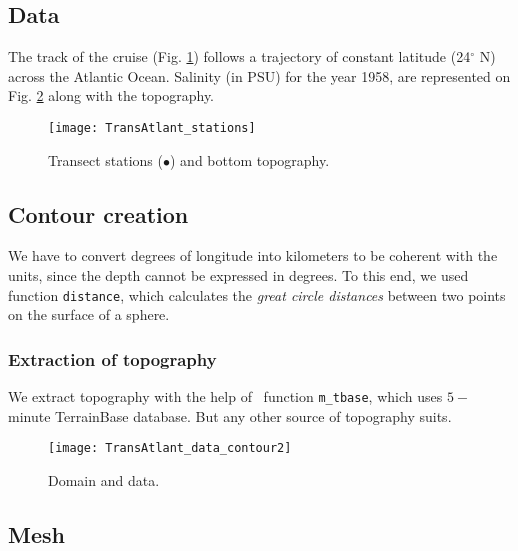 \subsection{Data}

The track of the cruise (Fig. \ref{fig:transectprofiles}) follows a trajectory of constant latitude (24$^{\circ}$ N) across the Atlantic Ocean. Salinity (in PSU) for the year 1958, are represented on Fig. \ref{fig:domaindata} along with the topography. 

\begin{figure}[htpb]
\centering
\texttt{[image: TransAtlant\_stations]}
\caption{Transect stations ($\bullet$) and bottom topography.\label{fig:transectprofiles}}
\end{figure}

\subsection{Contour creation}

We have to convert degrees of longitude into kilometers to be coherent with the units, since the depth cannot be expressed in degrees. To this end, we used \matlab\,function \texttt{distance}, which calculates the \textit{great circle distances} between two points on the surface of a sphere.  

\subsubsection{Extraction of topography}

We extract topography with the help of \matlab\, function  \texttt{m\_tbase}, which uses $5-$minute TerrainBase database. But any other source of topography suits.
				
\begin{figure}[H]
\centering
\texttt{[image: TransAtlant\_data\_contour2]}
\caption{Domain and data.\label{fig:domaindata}}
\end{figure}


%
%

\subsection{Mesh} 

